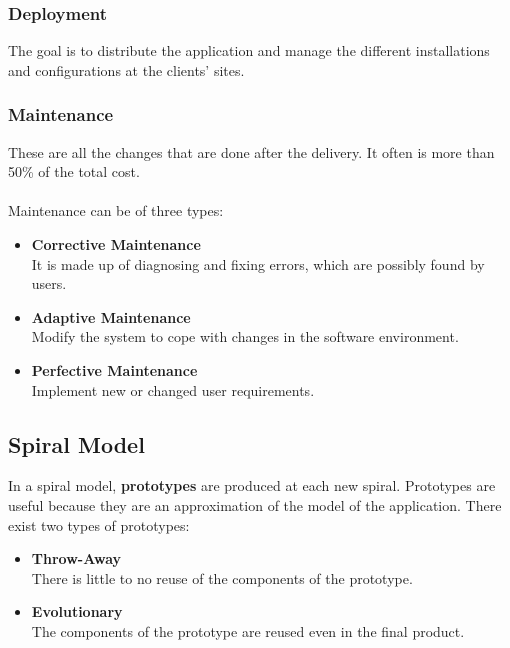 \documentclass{article}
\begin{document}
\subsubsection{Deployment}
The goal is to distribute the application and manage the different installations and configurations at the clients' sites.

\subsubsection{Maintenance}
These are all the changes that are done after the delivery. It often is more than 50\% of the total cost. \\ \\
Maintenance can be of three types:

\begin{itemize}
	\item \textbf{Corrective Maintenance}
	\vspace{.2cm} \\
	It is made up of diagnosing and fixing errors, which are possibly found by users.
	
	\item \textbf{Adaptive Maintenance}
	\vspace{.2cm} \\
	Modify the system to cope with changes in the software environment.
	
	\item \textbf{Perfective Maintenance}
	\vspace{.2cm} \\
	Implement new or changed user requirements.
\end{itemize}

\subsection{Spiral Model}
In a spiral model, \textbf{prototypes} are produced at each new spiral. Prototypes are useful because they are an approximation of the model of the application. There exist two types of prototypes:

\begin{itemize}
	\item \textbf{Throw-Away}
	\vspace{.2cm} \\
	There is little to no reuse of the components of the prototype.
	
	\item \textbf{Evolutionary}
	\vspace{.2cm} \\
	The components of the prototype are reused even in the final product.
\end{itemize}
\end{document}
